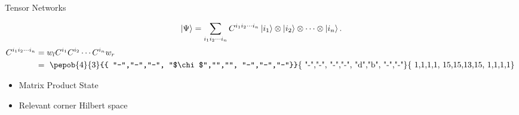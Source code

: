 \begin{frame}{Tensor Networks}

    \begin{equation}
        \ket{\Psi} = \sum_{i_1 i_2 \cdots i_n } C^{i_1 i_2 \cdots i_n} \ket{i_1} \otimes \ket{i_2} \otimes \cdots \otimes \ket{i_n}.
    \end{equation}
    \begin{equation}
        \begin{split}
            C^{i_1 i_2 \cdots i_n} &= w_l C^{i_1} C^{i_2} \cdots C^{i_n} w_r \\
            &=  \vcenter{ \hbox{ \pepob{4}{3}{{
                                "-","-","-",
                                "$\chi$","","",
                                "-","-","-"}}{{
                                "-","-",
                                "-","-",
                                "d","b",
                                "-","-"}}{{
                                1,1,1,1,
                                15,15,13,15,
                                1,1,1,1}} }}
        \end{split}
    \end{equation}

    \begin{itemize}
        \item Matrix Product State
        \item Relevant corner Hilbert space
    \end{itemize}
\end{frame}


